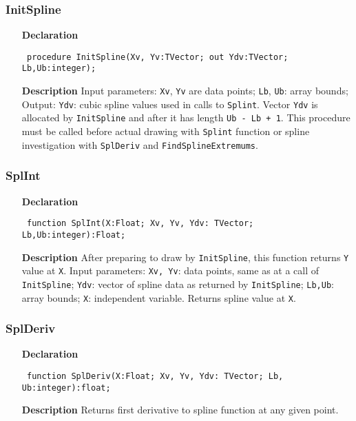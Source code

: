 \documentclass[12pt,a4paper,oneside]{report}
\newcommand{\declarationitem}[1]{\textbf{#1}}
\newcommand{\descriptiontitle}[1]{\textbf{#1}}
\newcommand{\code}[1]{\texttt{#1}}
\begin{document}
\subsubsection{InitSpline}
\label{uSpline-InitSpline}
\begin{itemize}\item[\declarationitem{Declaration}\hfill]
	\begin{flushleft}
		\code{
			procedure InitSpline(Xv, Yv:TVector; out Ydv:TVector; Lb,Ub:integer);}
		
	\end{flushleft}
	
	\par
	\item[\descriptiontitle{Description}]
	Input parameters: \code{Xv}, \code{Yv} are data points; \code{Lb}, \code{Ub}:  array bounds; Output: \code{Ydv}: cubic spline values used in calls to \code{Splint}. Vector \code{Ydv} is allocated by \code{InitSpline} and after it has length \code{Ub - Lb + 1}.  This procedure must be called before actual drawing with \code{Splint} function or spline investigation with \code{SplDeriv} and \code{FindSplineExtremums}.
\end{itemize}
\subsubsection{SplInt}
\label{uSpline-SplInt}
\begin{itemize}\item[\declarationitem{Declaration}\hfill]
	\begin{flushleft}
		\code{
			function SplInt(X:Float; Xv, Yv, Ydv: TVector; Lb,Ub:integer):Float;}
	\end{flushleft}
	\par
	\item[\descriptiontitle{Description}]
	After preparing to draw by \code{InitSpline}, this function returns \code{Y} value at \code{X}. Input parameters: \code{Xv, Yv}: data points, same as at a call of \code{InitSpline}; \code{Ydv}: vector of spline data as returned by \code{InitSpline}; \code{Lb,Ub}: array bounds; \code{X}: independent variable. Returns spline value at \code{X}.
	
\end{itemize}
\subsubsection{SplDeriv}
\label{uSpline-SplDeriv}
\begin{itemize}\item[\declarationitem{Declaration}\hfill]
	\begin{flushleft}
		\code{
			function SplDeriv(X:Float; Xv, Yv, Ydv: TVector; Lb, Ub:integer):float;}
		
	\end{flushleft}
	
	\par
	\item[\descriptiontitle{Description}]
	Returns first derivative to spline function at any given point.
	
\end{itemize}
\end{document}
